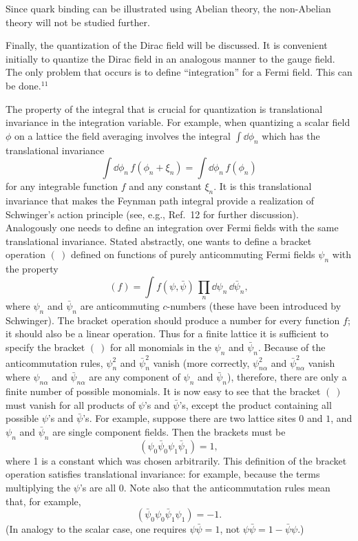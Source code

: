Since quark binding can be illustrated using Abelian theory, the
non-Abelian theory will not be studied further.

Finally, the quantization of the Dirac field will be discussed.  It is
convenient initially to quantize the Dirac field in an analogous manner
to the gauge field.  The only problem that occurs is to define
``integration'' for a Fermi field.  This can be done.${}^{11}$

The property of the integral that is crucial for quantization is
translational invariance in the integration variable.  For example, when
quantizing a scalar field $\phi$ on a lattice the field averaging
involves the integral $\int\dd\phi_{n}$ which has the translational
invariance
\begin{equation}
\int\dd\phi_{n}\,f(\phi_{n}+\xi_{n}) = \int\dd\phi_{n}\,f(\phi_{n})
\label{eq:3.30}
\end{equation}
for any integrable function $f$ and any constant $\xi_{n}$.  It is this
translational invariance that makes the Feynman path integral provide a
realization of Schwinger's action principle (see, e.g., Ref.~12 for
further discussion).  Analogously one needs to define an integration over
Fermi fields with the same translational invariance.  Stated abstractly,
one wants to define a bracket operation $(\ )$ defined on functions of
purely anticommuting Fermi fields $\psi_{n}$ with the property
\begin{equation}
(f) = \int f(\psi,\bar\psi)\,\prod_{n}\dd\psi_{n}\,\dd\bar\psi_{n},
\label{eq:3.31}
\end{equation}
where $\psi_{n}$ and $\bar\psi_{n}$ are anticommuting $c$-numbers (these
have been introduced by Schwinger).  The bracket operation should produce
a number for every function $f$; it should also be a linear operation.
Thus for a finite lattice it is sufficient to specify the bracket
$(\ )$ for all monomials in the $\psi_{n}$ and $\bar\psi_{n}$.  Because of
the anticommutation rules, $\psi_{n}^{2}$ and $\bar\psi_{n}^{2}$ vanish
(more correctly, $\psi_{n\alpha}^{2}$ and $\bar\psi_{n\alpha}^{2}$ vanish
where $\psi_{n\alpha}$ and $\bar\psi_{n\alpha}$ are any component of
$\psi_{n}$ and $\bar\psi_{n}$), therefore, there are only a finite number
of possible monomials.  It is now easy to see that the bracket $(\ )$
must vanish for all products of $\psi$'s and $\bar\psi$'s, except the
product containing all possible $\psi$'s and $\bar\psi$'s.  For example,
suppose there are two lattice sites $0$ and $1$, and $\psi_{n}$ and
$\bar\psi_{n}$ are single component fields.  Then the brackets must be
\begin{equation}
(\psi_{0}\bar\psi_{0}\psi_{1}\bar\psi_{1}) = 1,
\label{eq:3.32}
\end{equation}
where 1 is a constant which was chosen arbitrarily.  This definition of
the bracket operation satisfies translational invariance:  for example,
because the terms multiplying the $\psi$'s are all 0.  Note also that
the anticommutation rules mean that, for example,
\begin{equation}
(\bar\psi_{0}\psi_{0}\bar\psi_{1}\psi_{1}) = -1.
\label{eq:3.33}
\end{equation}
(In analogy to the scalar case, one requires $\psi\bar\psi = 1$, not
$\psi\bar\psi = 1 - \bar\psi\psi$.)

